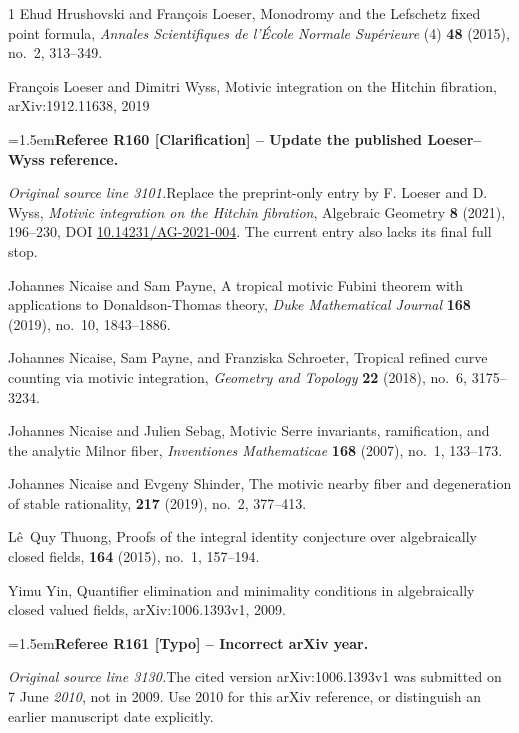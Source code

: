 \documentclass[12pt]{amsart}
\newcommand{\RefereeRemark}[4]{%
  \par\medskip\begingroup\normalfont\small\color{RefereePurple}%
  \emergencystretch=1.5em\noindent\textbf{Referee R#1 [#2] -- #3.}\par\nobreak\noindent #4\par
  \endgroup\medskip
}
\theoremstyle{plain}
\theoremstyle{definition}
\theoremstyle{remark}
\numberwithin{equation}{section}
\theoremstyle{plain}
\newcommand{\0}{\emptyset}
\begin{document}
\begin{thebibliography}{1}
Ehud Hrushovski and Fran{\c{c}}ois Loeser, {Monodromy and the {L}efschetz
  fixed point formula}, {\em Annales Scientifiques de l'\'Ecole Normale Sup\'erieure} (4) \textbf{48} (2015),
  no.~2, 313--349.

Fran{\c{c}}ois Loeser and Dimitri Wyss, {Motivic integration on the Hitchin fibration}, arXiv:1912.11638, 2019

\RefereeRemark{160}{Clarification}{Update the published Loeser--Wyss reference}{%
\textit{Original source line 3101.}\quad Replace the preprint-only entry by F. Loeser and D. Wyss, \emph{Motivic integration on the Hitchin fibration}, Algebraic Geometry \textbf{8} (2021), 196--230, DOI \href{https://doi.org/10.14231/AG-2021-004}{10.14231/AG-2021-004}. The current entry also lacks its final full stop.
}


Johannes Nicaise and Sam Payne, {A tropical motivic {F}ubini theorem with
  applications to {D}onaldson-{T}homas theory}, {\em Duke Mathematical Journal} \textbf{168} (2019), no.~10, 1843–1886.

Johannes Nicaise, Sam Payne, and Franziska Schroeter,
{Tropical refined curve counting via motivic integration}, {\em Geometry and Topology} \textbf{22} (2018),  no.~6, 3175--3234.

Johannes Nicaise and Julien Sebag,
{Motivic Serre invariants, ramification, and the analytic Milnor fiber}, {\em Inventiones Mathematicae} \textbf{168}  (2007), no.~1, 133--173.

Johannes Nicaise and Evgeny Shinder,
\newblock The motivic nearby fiber and degeneration of stable rationality,
 \textbf{217} (2019), no.~2, 377--413.


L{\^e}~Quy Thuong,
\newblock Proofs of the integral identity conjecture over algebraically closed
  fields,
 \textbf{164} (2015), no.~1, 157--194.

Yimu Yin, {Quantifier elimination and minimality conditions in
  algebraically closed valued fields}, arXiv:1006.1393v1, 2009.

\RefereeRemark{161}{Typo}{Incorrect arXiv year}{%
\textit{Original source line 3130.}\quad The cited version arXiv:1006.1393v1 was submitted on 7 June \emph{2010}, not in 2009. Use 2010 for this arXiv reference, or distinguish an earlier manuscript date explicitly.
}


\end{thebibliography}
\end{document}
